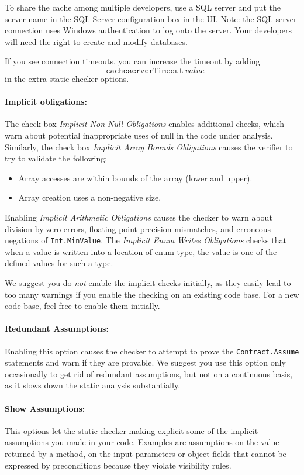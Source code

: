 \documentclass{article}
\newcommand{\code}[1]{\lstinline{#1}}
\begin{document}
To share the cache among multiple developers, use a SQL server and put
the server name in the SQL Server configuration box in the UI. Note:
the SQL server connection uses Windows authentication to log onto the
server. Your developers will need the right to create and modify
databases.

If you see connection timeouts, you can increase the timeout by adding
\[
\mathtt{-cacheserverTimeout}\ \textit{value}   
\]
in the extra static checker options.


\paragraph{Implicit obligations:}
The check box \emph{Implicit Non-Null Obligations} enables additional
checks, which warn about potential inappropriate uses of null in the code
under analysis.
Similarly, the check box \emph{Implicit Array Bounds Obligations}
causes the verifier to try to validate the following:
\begin{itemize}
\item Array accesses are within bounds of the array (lower and upper).
\item Array creation uses a non-negative size.
\end{itemize}
Enabling \emph{Implicit Arithmetic Obligations} causes the checker to
warn about division by zero errors, 
floating point precision mismatches, and erroneous negations of
\code{Int.MinValue}.
The \emph{Implicit Enum Writes Obligations} checks that when a value is written into a location of enum type, the value is one of the defined values for such a type.

We suggest you do \emph{not} enable the implicit checks initially, as
they easily lead to too many warnings if you enable the checking on an
existing code base. For a new code base, feel free to enable them
initially.

\paragraph{Redundant Assumptions:} Enabling this option causes the
checker to attempt to prove the \code{Contract.Assume} statements 
and warn if they are provable. We suggest you use this option only
occasionally to get rid of redundant assumptions, but not on a
continuous basis, as it slows down the static analysis substantially.


\paragraph{Show Assumptions:}
This options let the static checker making explicit some of the implicit assumptions you made in your code.
Examples are assumptions on the value returned by a method, on the input parameters or object fields that cannot be expressed by preconditions because they violate visibility rules.
\end{document}
